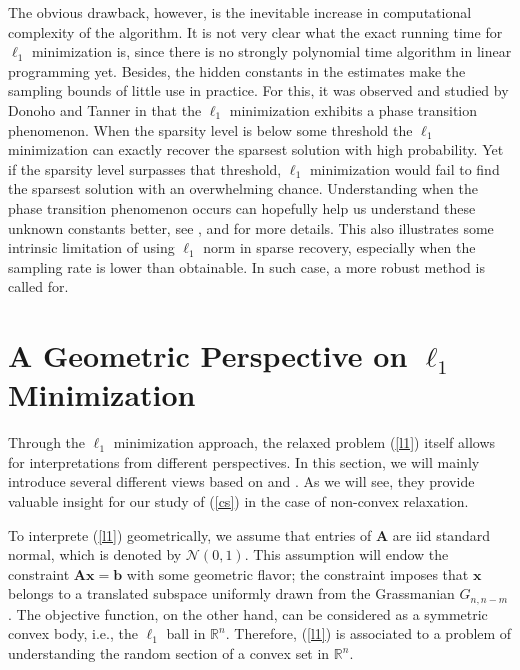 \documentclass[11pt]{article}
\numberwithin{equation}{section}
\theoremstyle{plain}
\theoremstyle{definition}
\def\R{{\mathbb R}}
\def\R{{\mathbb R}}
\def\A{{\mathbf A}}
\def\x{{\mathbf x}}
\def\b{{\mathbf b}}
\begin{document}
The obvious drawback, however, is the inevitable increase in computational complexity of the algorithm. It is not very clear what the exact running time for $\ell_1$ minimization is, since there is no strongly polynomial time algorithm in linear programming yet.   Besides, the hidden constants in the estimates make the sampling bounds of little use in practice. For this, it was observed and studied by Donoho and Tanner in \cite{donoho2005neighborliness} that the $\ell_1$ minimization exhibits a phase transition phenomenon. When the sparsity level is below some threshold the $\ell_1$ minimization can exactly recover the sparsest solution with high probability. Yet if the sparsity level surpasses that threshold, $\ell_1$ minimization would fail to find the sparsest solution with an overwhelming chance. Understanding when the phase transition phenomenon occurs can hopefully help us understand these unknown constants better, see \cite{donoho2006high}, \cite{donoho2005neighborliness} and \cite{donoho2009counting} for more details. This also illustrates some intrinsic limitation of using $\ell_1$ norm in sparse recovery, especially when the sampling rate is lower than obtainable. In such case, a more robust method is called for.    


\section{A Geometric Perspective on $\ell_1$ Minimization}\label{444}

Through the $\ell_1$ minimization approach, the relaxed problem (\ref{l1}) itself allows for interpretations from different perspectives. In this section, we will mainly introduce several different views based on \cite{vershynin2015estimation} and  \cite{zhang2013theory}. As we will see, they provide valuable insight for our study of (\ref{cs}) in the case of non-convex relaxation.     

 
To interprete (\ref{l1}) geometrically, we assume that entries of $\A$ are iid standard normal, which is denoted by $\mathcal{N}(0,1)$. This assumption will endow the constraint $\A\x=\b$ with some geometric flavor; the constraint imposes that $\x$ belongs to a translated subspace uniformly drawn from the Grassmanian $G_{n,n-m}$. The objective function, on the other hand, can be considered as a symmetric convex body, i.e., the $\ell_1$ ball in $\R^n$. Therefore, (\ref{l1}) is associated to a problem of understanding the random section of a convex set in $\R^n$. 
\end{document}
